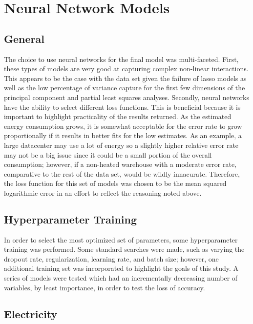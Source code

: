 
\section*{Neural Network Models}
\label{sec:nn_models}

\subsection{General}
The choice to use neural networks for the final model was multi-faceted.  First, these types of models are very good at capturing complex non-linear interactions.  This appears to be the case with the data set given the failure of lasso models as well as the low percentage of variance capture for the first few dimensions of the principal component and partial least squares analyses.  Secondly, neural networks have the ability to select different loss functions.  This is beneficial because it is important to highlight practicality of the results returned.  As the estimated energy consumption grows, it is somewhat acceptable for the error rate to grow proportionally if it results in better fits for the low estimates.  As an example, a large datacenter may use a lot of energy so a slightly higher relative error rate may not be a big issue since it could be a small portion of the overall consumption; however, if a non-heated warehouse with a moderate error rate, comparative to the rest of the data set, would be wildly innacurate.  Therefore, the loss function for this set of models was chosen to be the mean squared logarithmic error in an effort to reflect the reasoning noted above.

\subsection{Hyperparameter Training}
In order to select the most optimized set of parameters, some hyperparameter training was performed.  Some standard searches were made, such as varying the dropout rate, regularization, learning rate, and batch size; however, one additional training set was incorporated to highlight the goals of this study.  A series of models were tested which had an incrementally decreasing number of variables, by least importance, in order to test the loss of accuracy.

\subsection{Electricity}
